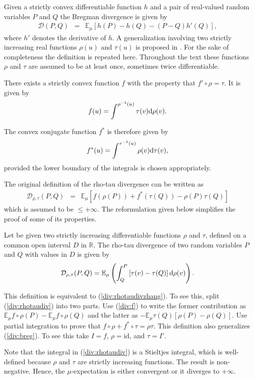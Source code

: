 \documentclass[graybox]{svmult}
\newcommand{\be}{\begin{equation}}
\newcommand{\ee}{\end{equation}}
\newcommand{\beq}{\begin{eqnarray}}
\newcommand{\eeq}{\end{eqnarray}}
\newcommand{\id}{\mbox{id}}
\newcommand{\Eo}{\mathbb E}
\newcommand{\Ro}{\mathbb R}
\newcommand{\Ddiv}{\mathcal{D}}
\newcommand{\upd}{{\rm d}}
\begin{document}
Given a strictly convex differentiable function $h$ and a pair of real-valued
random variables $P$ and $Q$ the Bregman divergence \cite{bregman1967}
is given by
\beq
\Ddiv (P,Q)&=&\Eo_\mu\left[ h(P)-h(Q)-(P-Q)h'(Q)\right],
\label{div:breg}
\eeq
where $h'$ denotes the derivative of $h$.
A generalization involving two strictly increasing real functions $\rho(u)$ and $\tau(u)$
is proposed in \cite {zhang2004a}. For the sake of completeness the definition is repeated here.
Throughout the text these functions $\rho$ and $\tau$ are assumed to be at least once,
sometimes twice differentiable.


There exists a strictly convex function $f$ with the property that $f'\circ \rho=\tau$.
It is given by
\be
\label{div:f}
f(u)=\int^{\rho^{-1}(u)} \tau(v)\upd \rho(v).
\ee

The convex conjugate function $f^*$ is therefore given by
\be
f^*(u)=\int^{\tau^{-1}(u)}\rho(v)\upd\tau(v),
\label{div:fstar}
\ee
provided the lower boundary of the integrals is chosen appropriately.

The original definition \cite{zhang2004a} of the rho-tau divergence can be written as
\beq
\Ddiv _{\rho,\tau}(P,Q)&=&\Eo_\mu\left[
f(\rho(P))+f^*(\tau(Q))-\rho(P)\tau(Q)\right]
\label{div:rhotaudivzhang}
\eeq
which is assumed to be $\le +\infty.$ The reformulation given below simplifies the proof of some of its properties.

\begin{definition}
Let be given two strictly increasing differentiable functions $\rho$ and $\tau$,
defined on a common open interval $D$ in $\Ro$.
The rho-tau divergence  of two random variables $P$ and $Q$ with values in $D$ is given by
\be
\Ddiv _{\rho,\tau}(P,Q)=\Eo_\mu\left(\int_Q^P\left[\tau(v)-\tau(Q)\right]\upd \rho(v)\right).
\label{div:rhotaudiv}
\ee
\end{definition}

This definition is equivalent to (\ref  {div:rhotaudivzhang}). To see this, split (\ref {div:rhotaudiv})
into two parts.
Use (\ref {div:f}) to write the former contribution as $\Eo_\mu f\circ\rho(P)-\Eo_\mu f\circ\rho(Q)$
and the latter as $-\Eo_\mu\tau(Q)[\rho(P)-\rho(Q)]$. Use partial integration to prove
that $f\circ\rho+f^*\circ\tau=\rho\tau$.
This definition also generalizes (\ref {div:breg}). To see this take $I=f$, $\rho=\id$, and $\tau=I'$.

Note that the integral in (\ref {div:rhotaudiv}) is a Stieltjes integral, which is well-defined because $\rho$ and $\tau$
are strictly increasing functions. The result is non-negative. Hence, the $\mu$-expectation
is either convergent or it diverges to $+\infty$.
\end{document}
